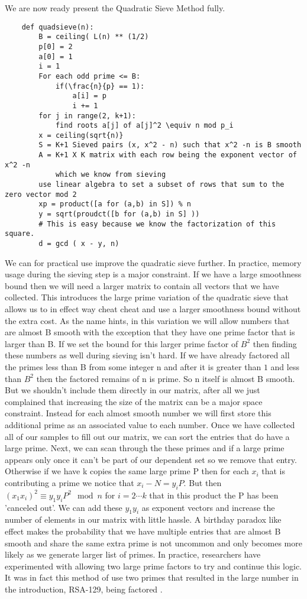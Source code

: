 \documentclass{article}
\begin{document}
We are now ready present the Quadratic Sieve Method fully. 
\begin{verbatim}
    def quadsieve(n):
        B = ceiling( L(n) ** (1/2)
        p[0] = 2
        a[0] = 1
        i = 1
        For each odd prime <= B:
            if(\frac{n}{p} == 1):
                a[i] = p
                i += 1
        for j in range(2, k+1):
            find roots a[j] of a[j]^2 \equiv n mod p_i
        x = ceiling(sqrt{n)}
        S = K+1 Sieved pairs (x, x^2 - n) such that x^2 -n is B smooth
        A = K+1 X K matrix with each row being the exponent vector of x^2 -n
            which we know from sieving
        use linear algebra to set a subset of rows that sum to the zero vector mod 2
        xp = product([a for (a,b) in S]) % n
        y = sqrt(proudct([b for (a,b) in S] )) 
        # This is easy because we know the factorization of this square.
        d = gcd ( x - y, n)
\end{verbatim}
We can for practical use improve the quadratic sieve further.  In practice, memory usage during the sieving step is a major constraint. If we have a large smoothness bound then we will need a larger matrix to contain all vectors that we have collected.  This introduces the large prime variation of the quadratic sieve that allows us to in effect way cheat cheat and use a larger smoothness bound without the extra cost.  As the name hints, in this variation we will allow numbers that are almost B smooth with the exception that they have one prime factor that is larger than B. If we set the bound for this larger prime factor of $B^2$ then finding these numbers as well during sieving isn't hard. If we have already factored all the primes less than B from some integer n and after it is greater than $1$ and less than $B^2$ then the factored remains of n is prime. So n itself is almost B smooth. But we shouldn't include them directly in our matrix, after all we just complained that increasing the size of the matrix can be a major space constraint. Instead for each almost smooth number we will first store this additional prime as an associated value to each number. Once we have collected all of our samples to fill out our matrix, we can sort the entries that do have a large prime. Next, we can scan through the these primes and if a large prime appears only once it can't be part of our dependent set so we remove that entry. Otherwise if we have k copies the same large prime P then for each $x_i$ that is contributing a prime we notice that $x_i - N = y_i P$. But then $(x_1 x_i)^2 \equiv y_1 y_i P^2 \mod n$ for $i = 2 \cdots k$ that in this product the P has been 'canceled out'. We can add these $y_1 y_i$ as exponent vectors and increase the number of elements in our matrix with little hassle. A birthday paradox like effect makes the probability that we have multiple entries that are almost B smooth and share the same extra prime is not uncommon and only  becomes more likely as we generate larger list of primes. In practice, researchers have experimented with allowing two large prime factors to try and continue this logic. It was in fact this method of use two primes that resulted in the large number in the introduction, RSA-129, being factored \cite{atkins1994magic}. 
\end{document}
